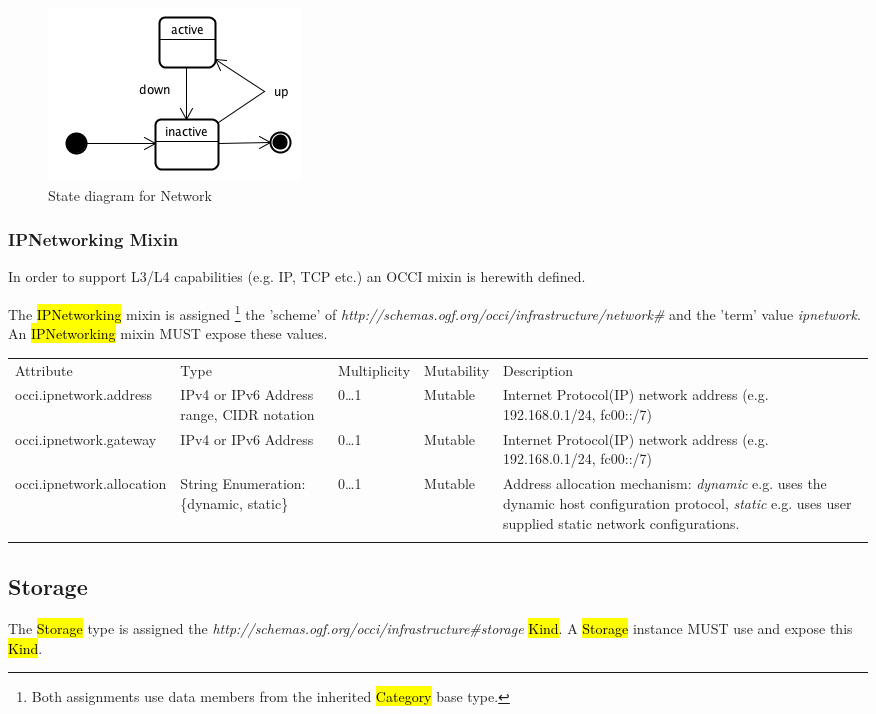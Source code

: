 \documentclass[10pt,a4paper]{article}
\begin{document}
\begin{figure}[!h]
	\centering
	\includegraphics[scale=0.4]{figs/network-state.png}
	\caption{State diagram for Network}
	\label{fig:network_state}
\end{figure}

\subsubsection{IPNetworking Mixin}

In order to support L3/L4 capabilities (e.g. IP, TCP etc.) an OCCI mixin is herewith defined. 

The \hl{IPNetworking} mixin is assigned 
\footnote{Both assignments use data members from the inherited \hl{Category} 
base type.} the 'scheme' of
\textit{http://schemas.ogf.org/occi/infrastructure/network\#} and the 'term' value 
\textit{ipnetwork}. An \hl{IPNetworking} mixin MUST expose these values.

\begin{tabular}{lp{2.5cm}p{1cm}lp{6cm}}
\toprule
Attribute&Type&Multi\-plicity&Mutability&Description\\
\colrule
occi.ipnetwork.address & IPv4 or IPv6 Address range, CIDR notation & 0\ldots1 & Mutable & Internet Protocol(IP) network address (e.g. 192.168.0.1/24, fc00::/7)\\
occi.ipnetwork.gateway & IPv4 or IPv6 Address & 0\ldots1 & Mutable & Internet Protocol(IP) network address (e.g. 192.168.0.1/24, fc00::/7)\\
occi.ipnetwork.allocation & String Enumeration: \{dynamic, static\} & 0\ldots1 & Mutable & Address allocation mechanism: \textit{dynamic} e.g. uses the dynamic host configuration protocol, \textit{static} e.g. uses user supplied static network configurations.\\
\botrule
\end{tabular}

\subsection{Storage}
The \hl{Storage} type is assigned the \textit{http://schemas.ogf.org/occi/infrastructure\#storage} \hl{Kind}. A \hl{Storage} instance MUST use and expose this \hl{Kind}.
\end{document}
